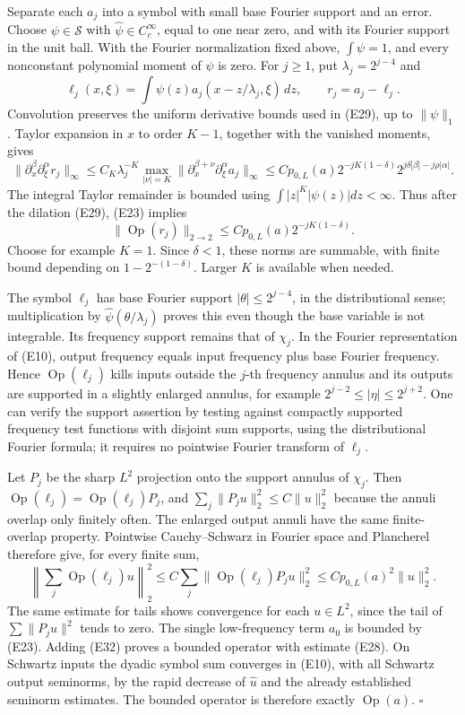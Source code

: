 \documentclass[
  11pt,
]{article}
\begin{document}
Separate each \(a_j\) into a symbol with small base Fourier support and
an error. Choose \(\psi\in\mathcal S\) with
\(\widehat\psi\in C_c^\infty\), equal to one near zero, and with its
Fourier support in the unit ball. With the Fourier normalization fixed
above, \(\int\psi=1\), and every nonconstant polynomial moment of
\(\psi\) is zero. For \(j\geq1\), put \(\lambda_j=2^{j-4}\) and \[
\ell_j(x,\xi)=\int\psi(z)a_j(x-z/\lambda_j,\xi)\,dz,
\qquad r_j=a_j-\ell_j.
\tag{E30}
\] Convolution preserves the uniform derivative bounds used in (E29), up
to \(\|\psi\|_1\). Taylor expansion in \(x\) to order \(K-1\), together
with the vanished moments, gives \[
\|\partial_x^\beta\partial_\xi^\alpha r_j\|_\infty
\leq C_K\lambda_j^{-K}
\max_{|\nu|=K}\|\partial_x^{\beta+\nu}
\partial_\xi^\alpha a_j\|_\infty
\leq C p_{0,L}(a)
2^{-jK(1-\delta)}2^{j\delta|\beta|-j\rho|\alpha|}.
\tag{E31}
\] The integral Taylor remainder is bounded using
\(\int|z|^K|\psi(z)|dz<\infty\). Thus after the dilation (E29), (E23)
implies \[
\|\operatorname{Op}(r_j)\|_{2\to2}
\leq C p_{0,L}(a)2^{-jK(1-\delta)}.
\tag{E32}
\] Choose for example \(K=1\). Since \(\delta<1\), these norms are
summable, with finite bound depending on \(1-2^{-(1-\delta)}\). Larger
\(K\) is available when needed.

The symbol \(\ell_j\) has base Fourier support \(|\theta|\leq2^{j-4}\),
in the distributional sense; multiplication by
\(\widehat\psi(\theta/\lambda_j)\) proves this even though the base
variable is not integrable. Its frequency support remains that of
\(\chi_j\). In the Fourier representation of (E10), output frequency
equals input frequency plus base Fourier frequency. Hence
\(\operatorname{Op}(\ell_j)\) kills inputs outside the \(j\)-th
frequency annulus and its outputs are supported in a slightly enlarged
annulus, for example \(2^{j-2}\leq|\eta|\leq2^{j+2}\). One can verify
the support assertion by testing against compactly supported frequency
test functions with disjoint sum supports, using the distributional
Fourier formula; it requires no pointwise Fourier transform of
\(\ell_j\).

Let \(P_j\) be the sharp \(L^2\) projection onto the support annulus of
\(\chi_j\). Then
\(\operatorname{Op}(\ell_j)=\operatorname{Op}(\ell_j)P_j\), and
\(\sum_j\|P_ju\|_2^2\leq C\|u\|_2^2\) because the annuli overlap only
finitely often. The enlarged output annuli have the same finite-overlap
property. Pointwise Cauchy--Schwarz in Fourier space and Plancherel
therefore give, for every finite sum, \[
\left\|\sum_j\operatorname{Op}(\ell_j)u\right\|_2^2
\leq C\sum_j\|\operatorname{Op}(\ell_j)P_ju\|_2^2
\leq C p_{0,L}(a)^2\|u\|_2^2.
\tag{E33}
\] The same estimate for tails shows convergence for each \(u\in L^2\),
since the tail of \(\sum\|P_ju\|^2\) tends to zero. The single
low-frequency term \(a_0\) is bounded by (E23). Adding (E32) proves a
bounded operator with estimate (E28). On Schwartz inputs the dyadic
symbol sum converges in (E10), with all Schwartz output seminorms, by
the rapid decrease of \(\widehat u\) and the already established
seminorm estimates. The bounded operator is therefore exactly
\(\operatorname{Op}(a)\). \(\square\)
\end{document}
